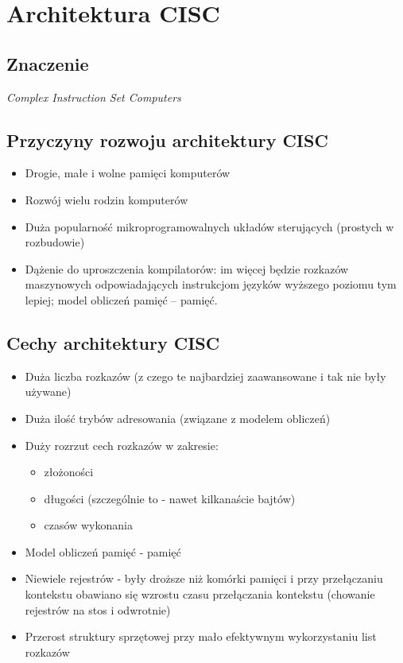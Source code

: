 \newpage
\section{Architektura CISC}
	\subsection{Znaczenie} \noindent
		\emph{Complex Instruction Set Computers}
	
	\subsection{Przyczyny rozwoju architektury CISC}
    	\begin{itemize}
	        \item Drogie, małe i wolne pamięci komputerów
	        \item Rozwój wielu rodzin komputerów
	        \item Duża popularność mikroprogramowalnych układów sterujących (prostych w rozbudowie)
	        \item Dążenie do uproszczenia kompilatorów: im więcej będzie rozkazów maszynowych odpowiadających instrukcjom języków wyższego poziomu tym lepiej; model obliczeń pamięć – pamięć.
        \end{itemize}
    
    \subsection{Cechy architektury CISC}
    	\begin{itemize}
	        \item Duża liczba rozkazów (z czego te najbardziej zaawansowane i tak nie były używane)
	        \item Duża ilość trybów adresowania (związane z modelem obliczeń)
	        \item Duży rozrzut cech rozkazów w zakresie:
	        \begin{itemize}
		        \item złożoności
		        \item długości (szczególnie to - nawet kilkanaście bajtów)
		        \item czasów wykonania
	        \end{itemize}
	        \item Model obliczeń pamięć - pamięć
	        \item Niewiele rejestrów - były droższe niż komórki pamięci i przy przełączaniu kontekstu obawiano się wzrostu czasu przełączania kontekstu (chowanie rejestrów na stos i odwrotnie)
	        \item Przerost struktury sprzętowej przy mało efektywnym wykorzystaniu list rozkazów
        \end{itemize}
   
